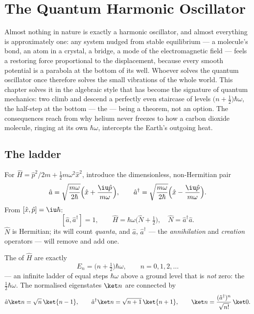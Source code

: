 \chapter{The Quantum Harmonic Oscillator}\label{ch:b3:harmonic-oscillator}

Almost nothing in nature is exactly a harmonic oscillator, and almost
everything is approximately one: any system nudged from stable
equilibrium --- a molecule's bond, an atom in a crystal, a bridge, a
mode of the electromagnetic field --- feels a restoring force
proportional to the displacement, because every smooth potential is a
parabola at the bottom of its well. Whoever solves the quantum
oscillator once therefore solves the small vibrations of the whole
world. This chapter solves it in the algebraic style that has become
the signature of quantum mechanics: two  climb and
descend a perfectly even staircase of levels $\big(n +
\tfrac12\big)\hbar\omega$, the half-step at the bottom --- the
 --- being a theorem, not an option. The
consequences reach from why helium never freezes to how a carbon
dioxide molecule, ringing at its own $\hbar\omega$, intercepts the
Earth's outgoing heat.

\section{The ladder}

\begin{definition}\label{def:b3:harmonic-oscillator:ladder}
For $\hat H = \hat p^2/2m + \tfrac12 m\omega^2\hat x^2$, introduce
the dimensionless, non-Hermitian pair
\[
\hat a = \sqrt{\frac{m\omega}{2\hbar}}\Big(\hat x +
\frac{\iu\hat p}{m\omega}\Big) , \qquad
\hat a^\dagger = \sqrt{\frac{m\omega}{2\hbar}}\Big(\hat x -
\frac{\iu\hat p}{m\omega}\Big) .
\]
From $[\hat x, \hat p] = \iu\hbar$:
\[
[\hat a, \hat a^\dagger] = 1 , \qquad
\hat H = \hbar\omega\Big(\hat N + \tfrac12\Big) , \quad
\hat N = \hat a^\dagger\hat a .
\]
$\hat N$ is Hermitian; its  will count \emph{quanta}, and
$\hat a$, $\hat a^\dagger$ --- the \emph{annihilation} and
\emph{creation} operators --- will remove and add one.
\end{definition}

\begin{theorem}\label{thm:b3:harmonic-oscillator:spectrum}
The  of $\hat H$ are exactly
\[
E_n = \Big(n + \tfrac12\Big)\hbar\omega , \qquad n = 0, 1, 2, \dots
\]
--- an infinite ladder of equal steps $\hbar\omega$ above a ground
level that is \emph{not} zero: the \emph{}
$\tfrac12\hbar\omega$. The normalised eigenstates $\ket n$ are
connected by
\[
\hat a\ket n = \sqrt n\,\ket{n - 1} , \qquad
\hat a^\dagger\ket n = \sqrt{n + 1}\,\ket{n + 1} ,
\qquad
\ket n = \frac{(\hat a^\dagger)^n}{\sqrt{n!}}\,\ket0 .
\]
\end{theorem}

